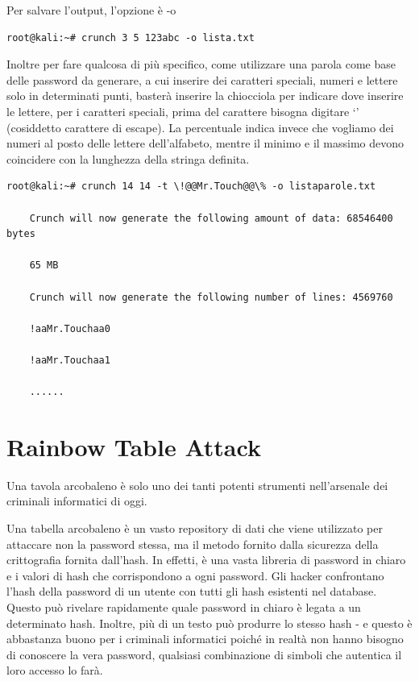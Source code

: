 Per salvare l’output, l’opzione è -o
\begin{lstlisting}[caption={Generazione dizionario con crunch }, style=javaScriptCode]
root@kali:~# crunch 3 5 123abc -o lista.txt
\end{lstlisting}
Inoltre per fare qualcosa di più specifico, come utilizzare una parola come base delle password da generare, a cui inserire dei caratteri speciali, numeri e lettere solo in determinati punti, basterà inserire la chiocciola per indicare dove inserire le lettere, per i caratteri speciali, prima del carattere bisogna digitare ‘’ (cosiddetto carattere di escape). La percentuale indica invece che vogliamo dei numeri al posto delle lettere dell’alfabeto, mentre il minimo e il massimo devono coincidere con la lunghezza della stringa definita.
\begin{lstlisting}[caption={Generazione dizionario "complesso" con crunch}, style=javaScriptCode]
root@kali:~# crunch 14 14 -t \!@@Mr.Touch@@\% -o listaparole.txt

    Crunch will now generate the following amount of data: 68546400 bytes

    65 MB

    Crunch will now generate the following number of lines: 4569760

    !aaMr.Touchaa0

    !aaMr.Touchaa1

    ......
\end{lstlisting}
\section{Rainbow Table Attack}
Una tavola arcobaleno \cite{Rainbow_table_attack} è solo uno dei tanti potenti strumenti nell'arsenale dei criminali informatici di oggi.

Una tabella arcobaleno è un vasto repository di dati che viene utilizzato per attaccare non la password stessa, ma il metodo fornito dalla sicurezza della crittografia fornita dall'hash. In effetti, è una vasta libreria di password in chiaro e i valori di hash che corrispondono a ogni password. Gli hacker confrontano l'hash della password di un utente con tutti gli hash esistenti nel database. Questo può rivelare rapidamente quale password in chiaro è legata a un determinato hash. Inoltre, più di un testo può produrre lo stesso hash - e questo è abbastanza buono per i criminali informatici poiché in realtà non hanno bisogno di conoscere la vera password, qualsiasi combinazione di simboli che autentica il loro accesso lo farà.

